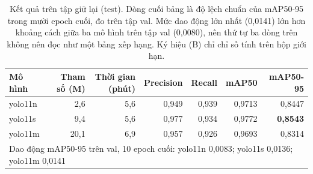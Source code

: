 \begin{table}[H]
\centering
\caption{Kết quả trên tập giữ lại (test). Dòng cuối bảng là độ lệch chuẩn của mAP50-95 trong mười epoch cuối, đo trên tập val. Mức dao động lớn nhất (0{,}0141) lớn hơn khoảng cách giữa ba mô hình trên tập val (0{,}0080), nên thứ tự ba dòng trên không nên đọc như một bảng xếp hạng. Ký hiệu (B) chỉ chỉ số tính trên hộp giới hạn.}
\label{tab:results}
\small
\begin{tabular}{l r r r r r r}
\toprule
Mô hình & Tham số (M) & Thời gian (phút) & Precision & Recall & mAP50 & mAP50-95 \\
\midrule
yolo11n & 2{,}6 & 5{,}6 & 0{,}949 & 0{,}939 & 0{,}9713 & 0{,}8447 \\
yolo11s & 9{,}4 & 5{,}6 & 0{,}977 & 0{,}934 & 0{,}9772 & \textbf{0{,}8543} \\
yolo11m & 20{,}1 & 6{,}9 & 0{,}957 & 0{,}926 & 0{,}9693 & 0{,}8314 \\
\midrule
\multicolumn{7}{l}{\small Dao động mAP50-95 trên val, 10 epoch cuối: yolo11n 0{,}0083; yolo11s 0{,}0136; yolo11m 0{,}0141} \\
\bottomrule
\end{tabular}
\end{table}
